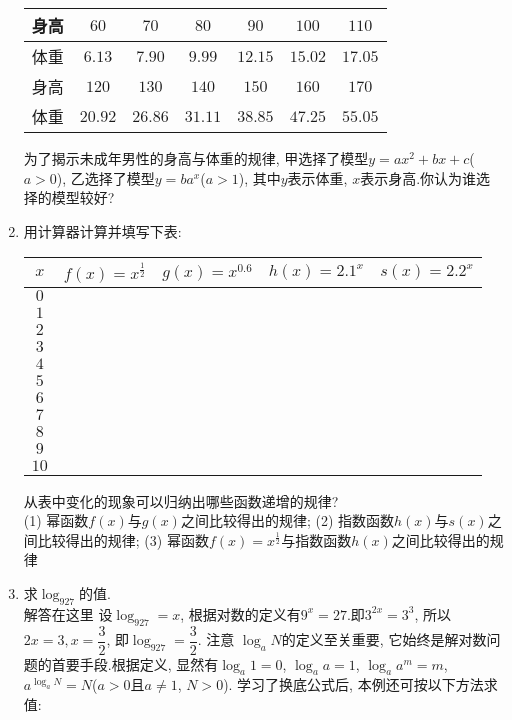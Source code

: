 \documentclass[10pt,a4paper]{article}
\begin{document}
\begin{enumerate}[1.]
\begin{center}
\begin{tabular}{|c|c|c|c|c|c|c|}
        \hline
        身高 & $60$ & $70$ & $80$ & $90$ & $100$ & $110$\\ \hline
        体重 & $6.13$ & $7.90$ & $9.99$ & $12.15$ & $15.02$ & $17.05$\\ \hline
        身高 & $120$ & $130$ & $140$ & $150$ & $160$ & $170$\\ \hline
        体重 & $20.92$ & $26.86$ & $31.11$ & $38.85$ & $47.25$ & $55.05$\\ \hline
    \end{tabular}
\end{center}
为了揭示未成年男性的身高与体重的规律, 甲选择了模型$y=ax^2+bx+c$($a>0$), 乙选择了模型$y=ba^x$($a>1$), 其中$y$表示体重, $x$表示身高.你认为谁选择的模型较好?
\item 用计算器计算并填写下表:
\begin{center}
    \begin{tabular}{|c|c|c|c|c|}
        \hline
        $x$	& $f(x)=x^{\frac 12}$ & $g(x)=x^{0.6}$ & $h(x)=2.1^x$ & $s(x)=2.2^x$ \\ \hline
        $0$ & & & & \\ \hline
        $1$ & & & & \\ \hline
        $2$ & & & & \\ \hline
        $3$ & & & & \\ \hline
        $4$ & & & & \\ \hline
        $5$ & & & & \\ \hline
        $6$ & & & & \\ \hline
        $7$ & & & & \\ \hline
        $8$ & & & & \\ \hline
        $9$ & & & & \\ \hline
        $10$ & & & & \\ \hline
    \end{tabular}
\end{center}
从表中变化的现象可以归纳出哪些函数递增的规律?\\
(1) 幂函数$f(x)$与$g(x)$之间比较得出的规律;
(2) 指数函数$h(x)$与$s(x)$之间比较得出的规律;
(3) 幂函数$f(x)=x^{\frac 12}$与指数函数$h(x)$之间比较得出的规律
\item 求$\log_927$的值.\\
解答在这里  设$\log_927=x$, 根据对数的定义有$9^x=27$.即$3^{2x}=3^3$,
所以$ 2x=3,x=\dfrac 32$, 即$\log_927=\dfrac 32$.
注意  $\log_aN$的定义至关重要, 它始终是解对数问题的首要手段.根据定义, 显然有$\log_a1=0$, $\log_aa=1$, $\log_aa^m=m$, $a^{\log_aN}=N$($a>0$且$a\ne 1$, $N>0$).
学习了换底公式后, 本例还可按以下方法求值:

\end{enumerate}
\end{document}
